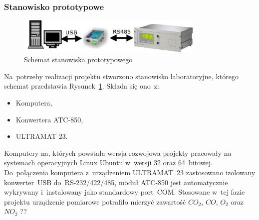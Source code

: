 \subsubsection{Stanowisko prototypowe}
\begin{figure}[!htb] 	\centering 	\includegraphics[width=0.8\textwidth]{images/schemat1} 	\caption{Schemat stanowiska prototypowego} \label{schemat1} \end{figure} 
Na~potrzeby realizacji projektu stworzono stanowisko laboratoryjne, którego schemat przedstawia Rysunek~\ref{schemat1}. Składa się ono~z:
\begin{itemize}
\item Komputera,
\item Konwertera ATC-850,
\item ULTRAMAT 23.
\end{itemize}
\indent
\indent Komputery na, których powstała wersja rozwojowa projekty pracowały na systemach operacyjnych Linux Ubuntu w~wersji 32 oraz 64~bitowej. Do~połączenia komputera z~urządzeniem ULTRAMAT~23 zastosowano izolowany konwerter~USB do~RS-232/422/485, moduł ATC-850 jest automatycznie wykrywany i~instalowany jako standardowy port~COM. Stosowane w~tej fazie projektu urządzenie pomiarowe potrafiło mierzyć zawartość $ CO_2 $, $ CO $, $ O_2 $ oraz $ NO_2 $ ??

